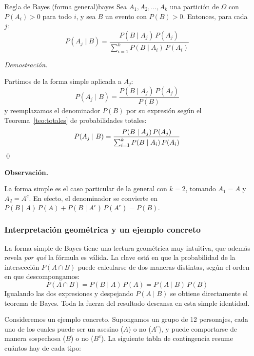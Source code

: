 \documentclass[12pt, a4paper]{book}
\newenvironment{observacion}{%
    \par\medskip\noindent\textbf{\color{azul}Observaci\'{o}n.}\enspace\itshape
}{\par\medskip}
\renewenvironment{proof}{%
    \par\medskip\noindent\textit{Demostraci\'{o}n.}\enspace
}{\qed\par\medskip}
\numberwithin{equation}{chapter}
\begin{document}
\begin{teorema}{Regla de Bayes (forma general)}{bayes}
	Sea $A_1, A_2, \ldots, A_k$ una partición de $\Omega$ con 
	$P(A_i) > 0$ para todo $i$, y sea $B$ un evento con $P(B) > 0$. 
	Entonces, para cada $j$:
	\[
	P(A_j \mid B) = \frac{P(B \mid A_j)\, P(A_j)}
	{\displaystyle\sum_{i=1}^{k} P(B \mid A_i)\, P(A_i)}
	\]
\end{teorema}

\begin{proof}
	Partimos de la forma simple aplicada a $A_j$:
	\[
	P(A_j \mid B) = \frac{P(B \mid A_j)\, P(A_j)}{P(B)}
	\]
	y reemplazamos el denominador $P(B)$ por su expresión según el 
	Teorema~\ref{teo:totales} de probabilidades totales:
	\[
	P(A_j \mid B) = \frac{P(B \mid A_j)\, P(A_j)}
	{\sum_{i=1}^{k} P(B \mid A_i)\, P(A_i)} \qedhere
	\]
\end{proof}

\begin{observacion}
	La forma simple es el caso particular de la general con $k = 2$, 
	tomando $A_1 = A$ y $A_2 = A^c$. En efecto, el denominador se 
	convierte en $P(B \mid A)\,P(A) + P(B \mid A^c)\,P(A^c) = P(B)$.
\end{observacion}

\subsubsection*{Interpretación geométrica y un ejemplo concreto}

La forma simple de Bayes tiene una lectura geométrica muy intuitiva, que 
además revela \textit{por qué} la fórmula es válida. La clave está en que 
la probabilidad de la intersección $P(A \cap B)$ puede calcularse de dos 
maneras distintas, según el orden en que descompongamos:
\[
P(A \cap B) = P(B \mid A)\,P(A) = P(A \mid B)\,P(B)
\]
Igualando las dos expresiones y despejando $P(A \mid B)$ se obtiene 
directamente el teorema de Bayes. Toda la fuerza del resultado descansa 
en esta simple identidad.

Consideremos un ejemplo concreto. Supongamos un grupo de 12 personajes, 
cada uno de los cuales puede ser un asesino ($A$) o no ($A^c$), y puede 
comportarse de manera sospechosa ($B$) o no ($B^c$). La siguiente tabla 
de contingencia resume cuántos hay de cada tipo:
\end{document}
